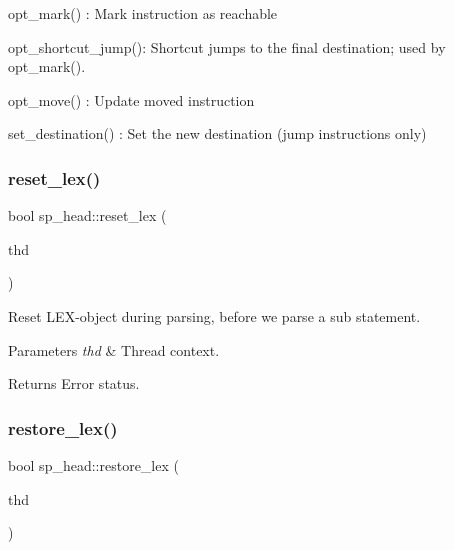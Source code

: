 \begin{DoxyItemize}
\item opt\+\_\+mark() \+: Mark instruction as reachable
\item opt\+\_\+shortcut\+\_\+jump()\+: Shortcut jumps to the final destination; used by opt\+\_\+mark().
\item opt\+\_\+move() \+: Update moved instruction
\item set\+\_\+destination() \+: Set the new destination (jump instructions only) 
\end{DoxyItemize}\mbox{\label{classsp__head_acfc6754187b9fadc8e2450d73ef0e59b}} 
\subsubsection{\texorpdfstring{reset\+\_\+lex()}{reset\_lex()}}
{\footnotesize\ttfamily bool sp\+\_\+head\+::reset\+\_\+lex (\begin{DoxyParamCaption}\item[{T\+HD $\ast$}]{thd }\end{DoxyParamCaption})}

Reset L\+EX-\/object during parsing, before we parse a sub statement.


\begin{DoxyParams}{Parameters}
{\em thd} & Thread context.\\
\hline
\end{DoxyParams}
\begin{DoxyReturn}{Returns}
Error status. 
\end{DoxyReturn}
\mbox{\label{classsp__head_aaa69ac1fb3285a0e5fd7d1983daab49d}} 
\subsubsection{\texorpdfstring{restore\+\_\+lex()}{restore\_lex()}}
{\footnotesize\ttfamily bool sp\+\_\+head\+::restore\+\_\+lex (\begin{DoxyParamCaption}\item[{T\+HD $\ast$}]{thd }\end{DoxyParamCaption})}

